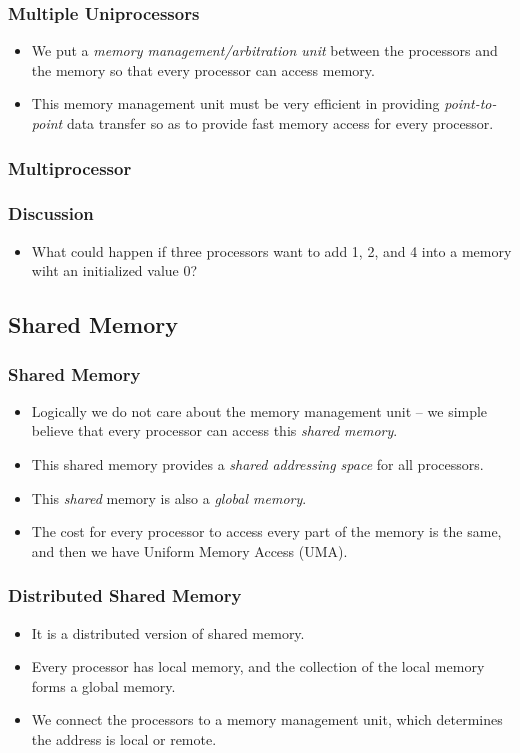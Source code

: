 \documentclass{beamer}
\begin{document}
\begin{CJK}{UTF8}{bsmi}
\begin{frame}
\frametitle{Multiple Uniprocessors}
\begin{itemize}
\item We put a {\em memory management/arbitration unit} between the
  processors and the memory so that every processor can access memory.
\item This memory management unit must be very efficient in providing
  {\em point-to-point} data transfer so as to provide fast memory
  access for every processor.
\end{itemize}
\end{frame}

\begin{frame}
\frametitle{Multiprocessor}
\centerline{}
\end{frame}

\begin{frame}
\frametitle{Discussion}
\begin{itemize}
\item What could happen if three processors want to add 1, 2, and 4
  into a memory wiht an initialized value 0?
\end{itemize}
\end{frame}

\subsection{Shared Memory}

\begin{frame}
\frametitle{Shared Memory}
\begin{itemize}
\item Logically we do not care about the memory management unit -- we
  simple believe that every processor can access this {\em shared
    memory}.
\item This shared memory provides a {\em shared addressing space} for
  all processors.
\item This {\em shared} memory is also a {\em global memory}.
\item The cost for every processor to access every part of the memory is the same, and then we have Uniform Memory Access (UMA).
\end{itemize}
\end{frame}

\begin{frame}
\frametitle{Distributed Shared Memory}
\begin{itemize}
\item It is a distributed version of shared memory.
\item Every processor has local memory, and the collection of the local memory forms a global memory.
\item We connect the processors to a memory management unit, which
  determines the address is local or remote.
\end{itemize}
\end{frame}


\end{CJK}
\end{document}
